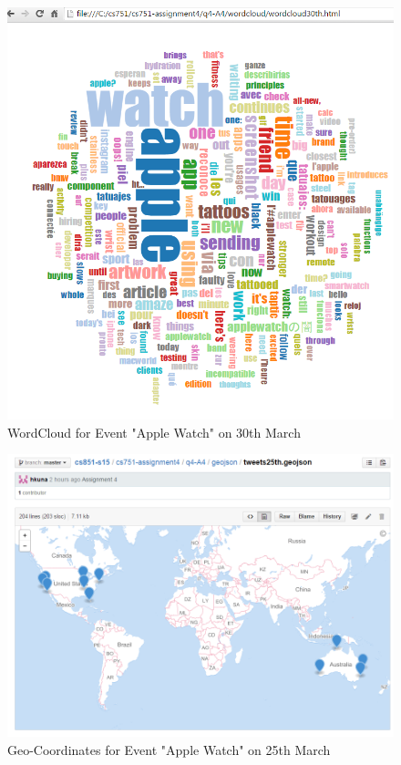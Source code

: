\documentclass[12pt]{Report}
\begin{document}
\begin{figure}[ht]    
    \begin{center}
        \includegraphics[scale=0.60]{word30th.png}
        \caption{WordCloud for Event "Apple Watch" on 30th March }
        \label{WordCloud for Event "Apple Watch" on 30th March}
    \end{center}
\end{figure}

\begin{figure}[ht]    
    \begin{center}
        \includegraphics[scale=0.60]{geojson25th.png}
        \caption{Geo-Coordinates for Event "Apple Watch" on 25th March }
        \label{Geo-Coordinates for Event "Apple Watch" on 25th March}
    \end{center}
\end{figure}
\end{document}
